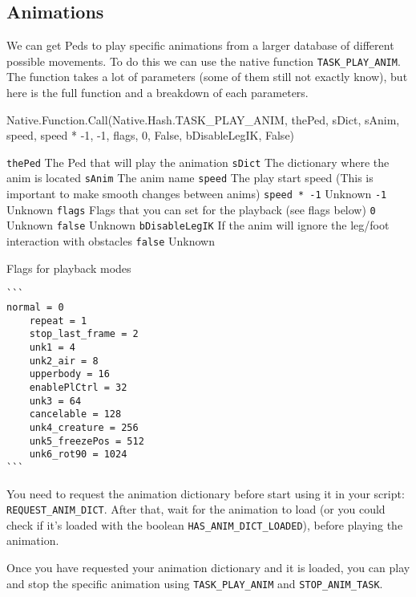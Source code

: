 \documentclass[
  openany]{book}
\newenvironment{Shaded}{\begin{snugshade}}{\end{snugshade}}
\newcommand{\DecValTok}[1]{\textcolor[rgb]{0.00,0.00,0.81}{#1}}
\newcommand{\FunctionTok}[1]{\textcolor[rgb]{0.00,0.00,0.00}{#1}}
\newcommand{\NormalTok}[1]{#1}
\begin{document}
\hypertarget{animations}{%
\subsection*{Animations}\label{animations}}

We can get Peds to play specific animations from a larger database of different possible movements. To do this we can use the native function \texttt{TASK\_PLAY\_ANIM}.
The function takes a lot of parameters (some of them still not exactly know), but here is the full function and a breakdown of each parameters.

\begin{Shaded}
\begin{Highlighting}[]
\NormalTok{Native.}\FunctionTok{Function}\NormalTok{.}\FunctionTok{Call}\NormalTok{(Native.}\FunctionTok{Hash}\NormalTok{.}\FunctionTok{TASK_PLAY_ANIM}\NormalTok{, thePed, sDict, sAnim, speed, speed * }\DecValTok{-1}\NormalTok{, }\DecValTok{-1}\NormalTok{, flags, }\DecValTok{0}\NormalTok{, False, bDisableLegIK, False) }
\end{Highlighting}
\end{Shaded}

\texttt{thePed} The Ped that will play the animation
\texttt{sDict} The dictionary where the anim is located
\texttt{sAnim} The anim name
\texttt{speed} The play start speed (This is important to make smooth changes between anims)
\texttt{speed\ *\ -1} Unknown
\texttt{-1} Unknown
\texttt{flags} Flags that you can set for the playback (see flags below)
\texttt{0} Unknown
\texttt{false} Unknown
\texttt{bDisableLegIK} If the anim will ignore the leg/foot interaction with obstacles
\texttt{false} Unknown

Flags for playback modes

\begin{verbatim}
```
normal = 0
    repeat = 1
    stop_last_frame = 2
    unk1 = 4
    unk2_air = 8
    upperbody = 16
    enablePlCtrl = 32
    unk3 = 64
    cancelable = 128
    unk4_creature = 256
    unk5_freezePos = 512
    unk6_rot90 = 1024
```
\end{verbatim}

You need to request the animation dictionary before start using it in your script: \texttt{REQUEST\_ANIM\_DICT}.
After that, wait for the animation to load (or you could check if it's loaded with the boolean \texttt{HAS\_ANIM\_DICT\_LOADED}), before playing the animation.

Once you have requested your animation dictionary and it is loaded, you can play and stop the specific animation using \texttt{TASK\_PLAY\_ANIM} and \texttt{STOP\_ANIM\_TASK}.
\end{document}
